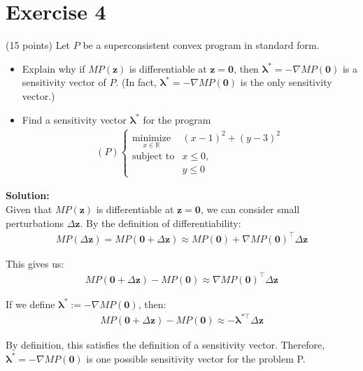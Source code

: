 \documentclass{article}
\begin{document}
\newpage

\section*{Exercise 4}
(15 points) Let $P$ be a superconsistent convex program in standard form.
\begin{itemize}
\item Explain why if $MP(\mathbf{z})$ is differentiable at $\mathbf{z} = \mathbf{0}$, then $\boldsymbol{\lambda}^* = -\nabla MP(\mathbf{0})$ is a sensitivity vector of $P$. (In fact, $\boldsymbol{\lambda}^* = -\nabla MP(\mathbf{0})$ is the only sensitivity vector.)
\item Find a sensitivity vector $\boldsymbol{\lambda}^*$ for the program
\begin{align*}
(P) \begin{cases}
\underset{x\in\mathbb{R}}{\text{minimize}} & (x - 1)^2 + (y - 3)^2 \\
\text{subject to} & x \leq 0, \\
& y \leq 0
\end{cases}
\end{align*}
\end{itemize}

\textbf{Solution:} \\

Given that $MP(\mathbf{z})$ is differentiable at $\mathbf{z} = \mathbf{0}$, we can consider small perturbations $\Delta \mathbf{z}$. By the definition of differentiability:
\begin{align*}
MP(\Delta\mathbf{z}) = MP(\mathbf{0} + \Delta\mathbf{z}) \approx MP(\mathbf{0}) + \nabla MP(\mathbf{0})^{\top} \Delta\mathbf{z}
\end{align*}

This gives us:
\begin{align*}
MP(\mathbf{0} + \Delta\mathbf{z}) - MP(\mathbf{0}) \approx \nabla MP(\mathbf{0})^{\top} \Delta\mathbf{z}
\end{align*}

If we define $\boldsymbol{\lambda}^* := -\nabla MP(\mathbf{0})$, then:
\begin{align*}
MP(\mathbf{0} + \Delta\mathbf{z}) - MP(\mathbf{0}) \approx -\boldsymbol{\lambda}^{*\top} \Delta\mathbf{z}
\end{align*}

By definition, this satisfies the definition of a sensitivity vector. Therefore, $\boldsymbol{\lambda}^* = -\nabla MP(\mathbf{0})$ is one possible sensitivity vector for the problem P. \\
\end{document}
